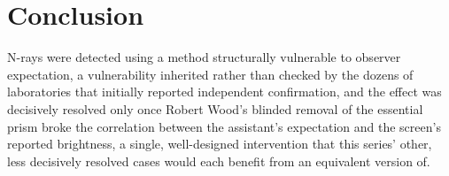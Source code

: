 \documentclass[11pt]{article}
\begin{document}
\section{Conclusion}

N-rays were detected using a method structurally vulnerable to observer expectation, a vulnerability inherited rather than checked by the dozens of laboratories that initially reported independent confirmation, and the effect was decisively resolved only once Robert Wood's blinded removal of the essential prism broke the correlation between the assistant's expectation and the screen's reported brightness, a single, well-designed intervention that this series' other, less decisively resolved cases would each benefit from an equivalent version of.
\end{document}
